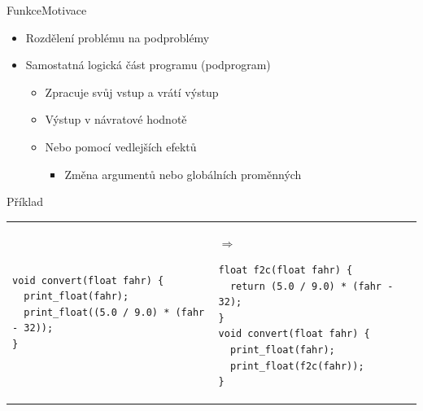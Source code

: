 \begin{frame}[fragile]{Funkce}{Motivace}

  \begin{itemize}
    \item Rozdělení problému na podproblémy

    \pause

    \item Samostatná logická část programu (podprogram)
    \begin{itemize}
      \item Zpracuje svůj vstup a vrátí výstup

      \pause

      \item Výstup v návratové hodnotě

      \pause

      \item Nebo pomocí vedlejších efektů
      \begin{itemize}
	\item Změna argumentů nebo globálních proměnných
      \end{itemize}
    \end{itemize}
  \end{itemize}

  \pause

\begin{block}{Příklad}
\begin{center}
\begin{tabular}{lll}
\begin{lstlisting}
void convert(float fahr) {
  print_float(fahr);
  print_float((5.0 / 9.0) * (fahr - 32));
}
\end{lstlisting}
& $\Rightarrow$~~~
\begin{lstlisting}
float f2c(float fahr) {
  return (5.0 / 9.0) * (fahr - 32);
}
void convert(float fahr) {
  print_float(fahr);
  print_float(f2c(fahr));
}
\end{lstlisting}
\end{tabular}
\end{center}
\end{block}

\end{frame}

